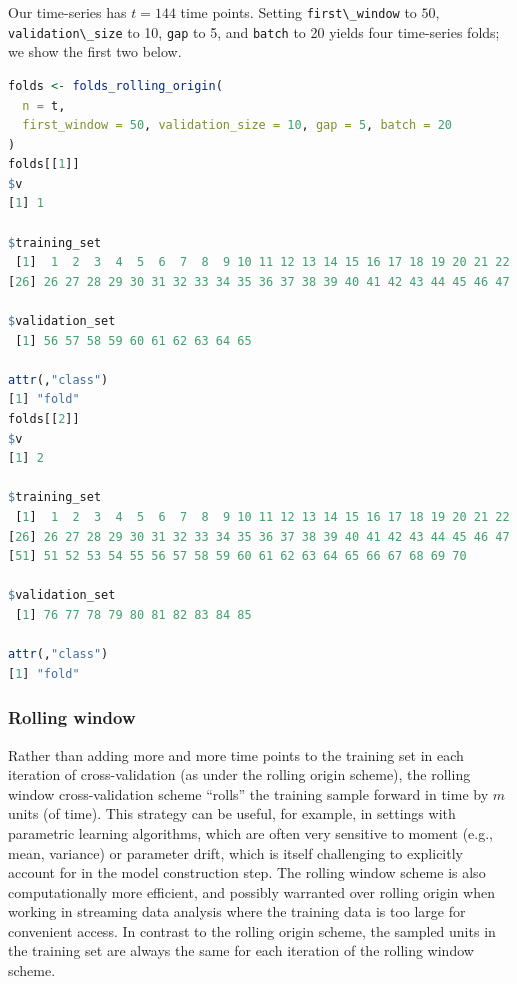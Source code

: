 \documentclass[
  12pt, krantz2,
]{krantz}
\newcommand{\passthrough}[1]{#1}
\newcommand{\1}{\mathbbm{1}}
\theoremstyle{definition}
\theoremstyle{definition}
\theoremstyle{definition}
\theoremstyle{definition}
\theoremstyle{remark}
\begin{document}
Our time-series has \(t=144\) time points. Setting \passthrough{\lstinline!first\_window!} to \(50\),
\passthrough{\lstinline!validation\_size!} to 10, \passthrough{\lstinline!gap!} to 5, and \passthrough{\lstinline!batch!} to 20 yields four time-series
folds; we show the first two below.

\begin{lstlisting}[language=R]
folds <- folds_rolling_origin(
  n = t,
  first_window = 50, validation_size = 10, gap = 5, batch = 20
)
folds[[1]]
$v
[1] 1

$training_set
 [1]  1  2  3  4  5  6  7  8  9 10 11 12 13 14 15 16 17 18 19 20 21 22 23 24 25
[26] 26 27 28 29 30 31 32 33 34 35 36 37 38 39 40 41 42 43 44 45 46 47 48 49 50

$validation_set
 [1] 56 57 58 59 60 61 62 63 64 65

attr(,"class")
[1] "fold"
folds[[2]]
$v
[1] 2

$training_set
 [1]  1  2  3  4  5  6  7  8  9 10 11 12 13 14 15 16 17 18 19 20 21 22 23 24 25
[26] 26 27 28 29 30 31 32 33 34 35 36 37 38 39 40 41 42 43 44 45 46 47 48 49 50
[51] 51 52 53 54 55 56 57 58 59 60 61 62 63 64 65 66 67 68 69 70

$validation_set
 [1] 76 77 78 79 80 81 82 83 84 85

attr(,"class")
[1] "fold"
\end{lstlisting}

\hypertarget{rolling-window}{%
\subsubsection{Rolling window}\label{rolling-window}}

Rather than adding more and more time points to the training set in each
iteration of cross-validation (as under the rolling origin scheme), the rolling
window cross-validation scheme ``rolls'' the training sample forward in time by
\(m\) units (of time). This strategy can be useful, for example, in settings with
parametric learning algorithms, which are often very sensitive to moment (e.g.,
mean, variance) or parameter drift, which is itself challenging to explicitly
account for in the model construction step. The rolling window scheme is also
computationally more efficient, and possibly warranted over rolling origin
when working in streaming data analysis where the training data is too large
for convenient access. In contrast to the
rolling origin scheme, the sampled units in the training set are always the same
for each iteration of the rolling window scheme.
\end{document}
